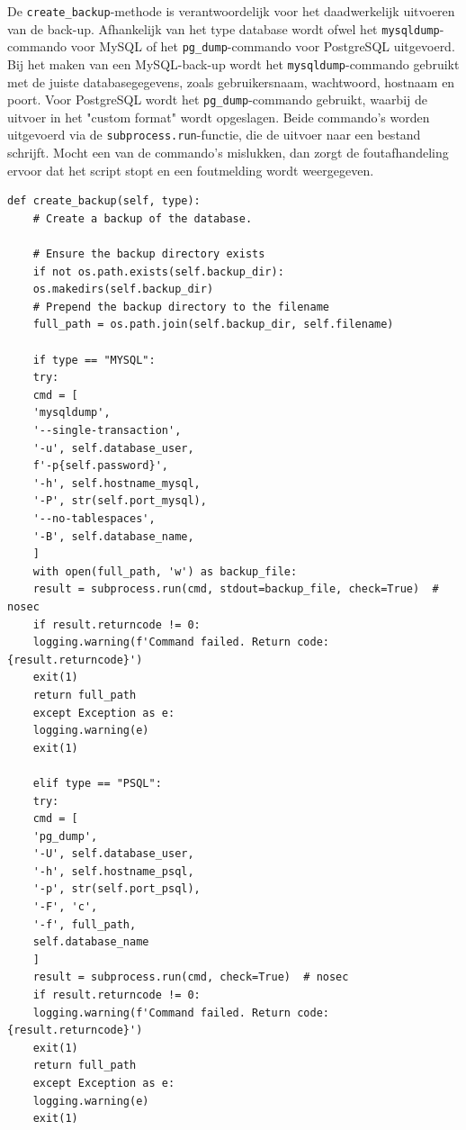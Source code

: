 De \texttt{create\_backup}-methode is verantwoordelijk voor het daadwerkelijk uitvoeren van de back-up. Afhankelijk van het type database wordt ofwel het \texttt{mysqldump}-commando voor MySQL of het \texttt{pg\_dump}-commando voor PostgreSQL uitgevoerd. Bij het maken van een MySQL-back-up wordt het \texttt{mysqldump}-commando gebruikt met de juiste databasegegevens, zoals gebruikersnaam, wachtwoord, hostnaam en poort. Voor PostgreSQL wordt het \texttt{pg\_dump}-commando gebruikt, waarbij de uitvoer in het "custom format" wordt opgeslagen. Beide commando’s worden uitgevoerd via de \texttt{subprocess.run}-functie, die de uitvoer naar een bestand schrijft. Mocht een van de commando's mislukken, dan zorgt de foutafhandeling ervoor dat het script stopt en een foutmelding wordt weergegeven.
\begin{lstlisting}[language=script, caption={create\_backup-methode van het python-script.}]
    def create_backup(self, type):
    # Create a backup of the database.
    
    # Ensure the backup directory exists
    if not os.path.exists(self.backup_dir):
    os.makedirs(self.backup_dir)
    # Prepend the backup directory to the filename
    full_path = os.path.join(self.backup_dir, self.filename)
    
    if type == "MYSQL":
    try:
    cmd = [
    'mysqldump',
    '--single-transaction',
    '-u', self.database_user,
    f'-p{self.password}',
    '-h', self.hostname_mysql,
    '-P', str(self.port_mysql),
    '--no-tablespaces',
    '-B', self.database_name,
    ]
    with open(full_path, 'w') as backup_file:
    result = subprocess.run(cmd, stdout=backup_file, check=True)  # nosec
    if result.returncode != 0:
    logging.warning(f'Command failed. Return code: {result.returncode}')
    exit(1)
    return full_path
    except Exception as e:
    logging.warning(e)
    exit(1)

    elif type == "PSQL":
    try:
    cmd = [
    'pg_dump',
    '-U', self.database_user,
    '-h', self.hostname_psql,
    '-p', str(self.port_psql),
    '-F', 'c',
    '-f', full_path,
    self.database_name
    ]
    result = subprocess.run(cmd, check=True)  # nosec
    if result.returncode != 0:
    logging.warning(f'Command failed. Return code: {result.returncode}')
    exit(1)
    return full_path
    except Exception as e:
    logging.warning(e)
    exit(1)
\end{lstlisting}

